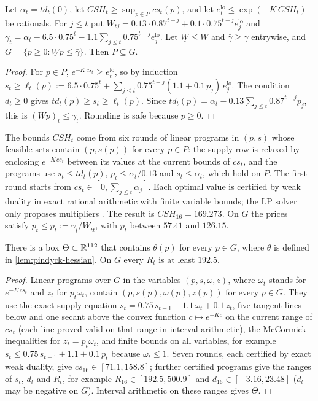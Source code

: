 \begin{lemma}\label{lem:pindyck-polytope}
Let $\alpha_t=td_t(0)$, let $CSH_t\ge\sup_{p\in P}cs_t(p)$, and let $e_{t}^{\mathrm{lo}}\le\exp(-K\,CSH_t)$ be rationals.
For $j\le t$ put $W_{tj}=0.13\cdot0.87^{t-j}+0.1\cdot0.75^{t-j}e_j^{\mathrm{lo}}$ and
$\gamma_t=\alpha_t-6.5\cdot0.75^t-1.1\sum_{j\le t}0.75^{t-j}e_j^{\mathrm{lo}}$.
Let $\underline W\le W$ and $\bar\gamma\ge\gamma$ entrywise, and $G=\{p\ge0:\underline Wp\le\bar\gamma\}$.
Then $P\subseteq G$.
\end{lemma}

\begin{proof}
For $p\in P$, $e^{-K\,cs_t}\ge e_t^{\mathrm{lo}}$, so by induction
$s_t\ge\ell_t(p):=6.5\cdot0.75^t+\sum_{j\le t}0.75^{t-j}(1.1+0.1\,p_j)\,e_j^{\mathrm{lo}}$.
The condition $d_t\ge0$ gives $td_t(p)\ge s_t\ge\ell_t(p)$.
Since $td_t(p)=\alpha_t-0.13\sum_{j\le t}0.87^{t-j}p_j$, this is $(Wp)_t\le\gamma_t$.
Rounding is safe because $p\ge0$.
\end{proof}

The bounds $CSH_t$ come from six rounds of linear programs in $(p,s)$ whose feasible sets contain $(p,s(p))$ for every $p\in P$:
the supply row is relaxed by enclosing $e^{-K\,cs_t}$ between its values at the current bounds of $cs_t$,
and the programs use $s_t\le td_t(p)$, $p_t\le\alpha_t/0.13$ and $s_t\le\alpha_t$, which hold on $P$.
The first round starts from $cs_t\in[0,\sum_{j\le t}\alpha_j]$.
Each optimal value is certified by weak duality in exact rational arithmetic with finite variable bounds; the LP solver only proposes multipliers \citep{neumaier2004-safe-bounds-in-linear-and}.
The result is $CSH_{16}=169.273$.
On $G$ the prices satisfy $p_t\le\bar p_t:=\bar\gamma_t/\underline W_{tt}$, with $\bar p_t$ between $57.41$ and $126.15$.

\begin{lemma}\label{lem:pindyck-ranges}
There is a box $\Theta\subset\mathbb{R}^{112}$ that contains $\theta(p)$ for every $p\in G$, where $\theta$ is defined in \cref{lem:pindyck-hessian}.
On $G$ every $R_t$ is at least $192.5$.
\end{lemma}

\begin{proof}
Linear programs over $G$ in the variables $(p,s,\omega,z)$, where $\omega_t$ stands for $e^{-K\,cs_t}$ and $z_t$ for $p_t\omega_t$, contain $(p,s(p),\omega(p),z(p))$ for every $p\in G$.
They use the exact supply equation $s_t=0.75\,s_{t-1}+1.1\,\omega_t+0.1\,z_t$,
five tangent lines below and one secant above the convex function $c\mapsto e^{-Kc}$ on the current range of $cs_t$ (each line proved valid on that range in interval arithmetic),
the McCormick inequalities for $z_t=p_t\omega_t$,
and finite bounds on all variables, for example $s_t\le0.75\,s_{t-1}+1.1+0.1\,\bar p_t$ because $\omega_t\le1$.
Seven rounds, each certified by exact weak duality, give $cs_{16}\in[71.1,158.8]$; further certified programs give the ranges of $s_t$, $d_t$ and $R_t$,
for example $R_{16}\in[192.5,500.9]$ and $d_{16}\in[-3.16,23.48]$ ($d_t$ may be negative on $G$).
Interval arithmetic on these ranges gives $\Theta$.
\end{proof}

